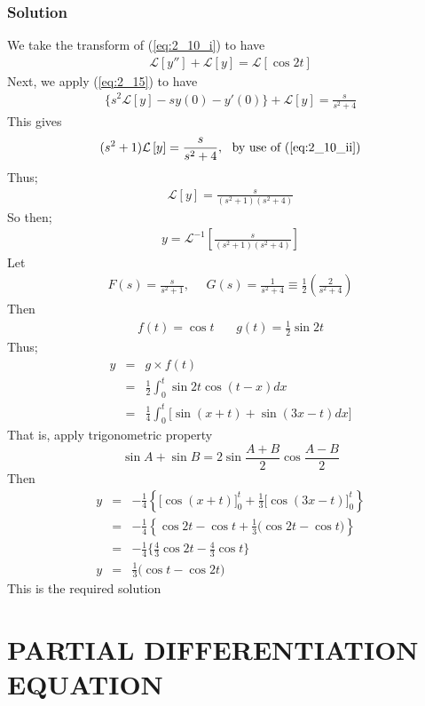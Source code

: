 \documentclass[11pt]{report}
\newcommand{\Laplace}{\mathcal{L}}
\newcommand{\ft}{f(t)}
\newcommand{\sbracket}[1]{\left[#1\right]}
\newcommand{\Ly}{\Laplace \sbracket{y}}
\newcommand{\Lyp}[1]{\Laplace \sbracket{y{#1}}}
\newcommand{\LFn}[1]{\Laplace \sbracket{#1}}
\newcommand{\InverseL}[1]{\Laplace^{-1}\left[#1\right]}
\newcommand{\sps}{\\[0.2cm]}
\newcommand{\refn}[1]{(\ref{#1})}
\newcommand{\refx}[1]{\refn{eq:#1}}
\newcommand{\sprime}{'}
\newcommand{\dprime}{''}
\begin{document}
	\subsection*{Solution}
	We take the transform of \refx{2_10_i} to have
	\begin{eqnarray*}
		\Lyp{\dprime} + \Ly = \LFn{\cos 2t}
	\end{eqnarray*}
	Next, we apply \refx{2_15} to have
	\begin{eqnarray*}
		\Big\{ s^2\Ly - sy(0) - y\sprime(0) \Big\}+ \Ly = \frac{s}{s^2 + 4}
	\end{eqnarray*}
	This gives
	\begin{eqnarray*}
		(s^2+1)\Ly = \frac{s}{s^2 + 4},~~ \text{by use of \refx{2_10_ii}}
	\end{eqnarray*}
	Thus;
	\begin{eqnarray*}
		\Ly = \frac{s}{(s^2+1)(s^2+4)}
	\end{eqnarray*}
	So then;
	\begin{eqnarray*}
		y = \InverseL{\frac{s}{(s^2+1)(s^2+4)}}
	\end{eqnarray*}
	Let
	\begin{eqnarray*}
		F(s)=\frac{s}{s^2+1}, ~~~~~~ G(s)= \frac{1}{s^2+4} \equiv \frac{1}{2}\left(\frac{2}{s^2+4}\right)
	\end{eqnarray*}
	Then
	\begin{eqnarray*}
		f(t)=\cos t ~~~~~~~~ g(t)=\frac{1}{2}\sin 2t
	\end{eqnarray*}
	Thus;
	\begin{eqnarray*}
		y &=& g \times \ft\sps
		&=&\frac{1}{2}\int_0^t\sin 2t\cos(t-x)dx\sps
		&=&\frac{1}{4}\int_0^t\Big[\sin(x+t)+\sin(3x-t)dx\Big]
	\end{eqnarray*}
	That is, apply trigonometric property
	\begin{equation*}
		\sin A + \sin B = 2\sin\frac{A+B}{2}\cos\frac{A-B}{2}
	\end{equation*}
	Then
	\begin{eqnarray*}
		y&=&-\frac{1}{4}\left\{ \Big[\cos(x+t)\Big]_0^t + \frac{1}{3}\Big[\cos(3x-t)\Big]_0^t \right\}\sps
		&=&-\frac{1}{4}\left\{\cos 2t - \cos t + \frac{1}{3}\Big(\cos 2t - \cos t\Big)\right\}\sps
		&=&-\frac{1}{4}\Big\{\frac{4}{3}\cos 2t - \frac{4}{3}\cos t\Big\}\sps
		y&=&\frac{1}{3}\Big(\cos t - \cos 2t\Big)
	\end{eqnarray*}
	This is the required solution
	
	\chapter{PARTIAL DIFFERENTIATION EQUATION}
\end{document}
